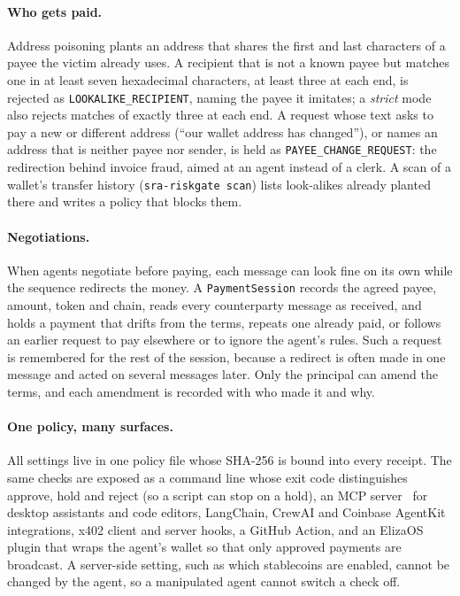 \documentclass[11pt]{article}
\newcommand{\code}[1]{\texttt{#1}}
\begin{document}
\paragraph{Who gets paid.} Address poisoning plants an address that shares the first and last characters of a payee the victim already uses. A recipient that is not a known payee but matches one in at least seven hexadecimal characters, at least three at each end, is rejected as \code{LOOKALIKE\_RECIPIENT}, naming the payee it imitates; a \emph{strict} mode also rejects matches of exactly three at each end. A request whose text asks to pay a new or different address (``our wallet address has changed''), or names an address that is neither payee nor sender, is held as \code{PAYEE\_CHANGE\_REQUEST}: the redirection behind invoice fraud, aimed at an agent instead of a clerk. A scan of a wallet's transfer history (\code{sra-riskgate scan}) lists look-alikes already planted there and writes a policy that blocks them.

\paragraph{Negotiations.} When agents negotiate before paying, each message can look fine on its own while the sequence redirects the money. A \code{PaymentSession} records the agreed payee, amount, token and chain, reads every counterparty message as received, and holds a payment that drifts from the terms, repeats one already paid, or follows an earlier request to pay elsewhere or to ignore the agent's rules. Such a request is remembered for the rest of the session, because a redirect is often made in one message and acted on several messages later. Only the principal can amend the terms, and each amendment is recorded with who made it and why.

\paragraph{One policy, many surfaces.} All settings live in one policy file whose SHA-256 is bound into every receipt. The same checks are exposed as a command line whose exit code distinguishes approve, hold and reject (so a script can stop on a hold), an MCP server~\cite{mcp,mcpserver} for desktop assistants and code editors, LangChain, CrewAI and Coinbase AgentKit integrations, x402 client and server hooks, a GitHub Action, and an ElizaOS plugin that wraps the agent's wallet so that only approved payments are broadcast. A server-side setting, such as which stablecoins are enabled, cannot be changed by the agent, so a manipulated agent cannot switch a check off.
\end{document}
